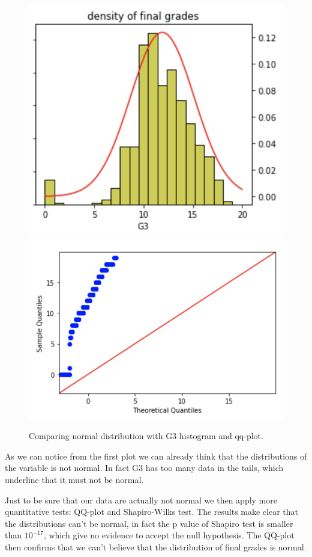 \documentclass[a4paper, 11pt]{article}
\theoremstyle{definition}
\numberwithin{equation}{section}		%
\numberwithin{table}{section}				%
\begin{document}
\begin{figure}[h]
\centering
\includegraphics[scale=0.5]{G3_distribution.png}
\includegraphics[scale=0.5]{qq-plot_G3.png}
\caption{Comparing normal distribution with G3 histogram and qq-plot.}
\end{figure}

As we can notice from the first plot we can already think that the distributions of the variable is not normal. In fact G3 has too many data in the tails, which underline that it must not be normal.

Just to be sure that our data are actually not normal we then apply more quantitative tests: QQ-plot and Shapiro-Wilks test.
The results make clear that the distributions can't be normal, in fact the p value of Shapiro test is smaller than $10^{-17}$, which give no evidence to accept the null hypothesis. The QQ-plot then confirms that we can't believe that the distribution of final grades is normal.
\end{document}
